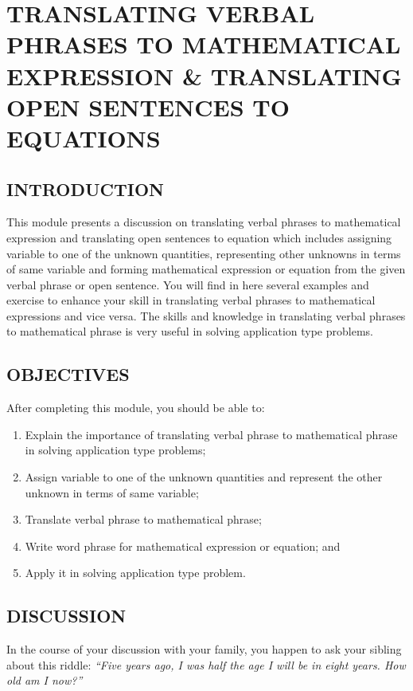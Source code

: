 \chapter{TRANSLATING VERBAL PHRASES TO MATHEMATICAL
EXPRESSION \& TRANSLATING OPEN SENTENCES TO
EQUATIONS}
\section*{INTRODUCTION}
This module presents a discussion on translating verbal phrases to mathematical expression
and translating open sentences to equation which includes assigning variable to one of the unknown
quantities, representing other unknowns in terms of same variable and forming mathematical
expression or equation from the given verbal phrase or open sentence. You will find in here several
examples and exercise to enhance your skill in translating verbal phrases to mathematical
expressions and vice versa. The skills and knowledge in translating verbal phrases to mathematical
phrase is very useful in solving application type problems.

\section*{OBJECTIVES}
After completing this module, you should be able to:
\begin{enumerate}
\item Explain the importance of translating verbal phrase to mathematical phrase in solving
application type problems;
\item Assign variable to one of the unknown quantities and represent the other unknown in terms
of same variable;
\item Translate verbal phrase to mathematical phrase;
\item Write word phrase for mathematical expression or equation; and
\item Apply it in solving application type problem.
\end{enumerate}
\section*{DISCUSSION}
In the course of your discussion with your family, you happen to ask your sibling about this riddle:
\textit{“Five years ago, I was half the age I will be in eight years. How old am I now?”}

